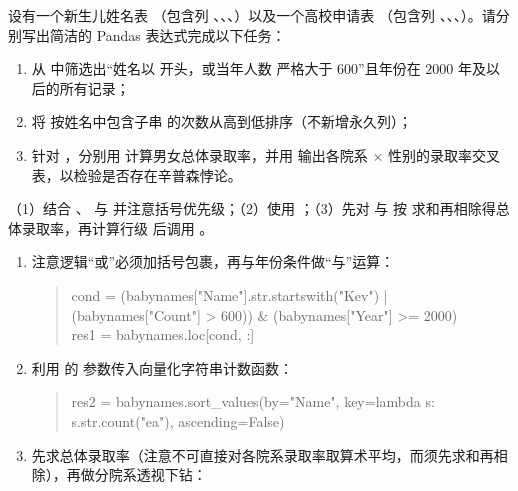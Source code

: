 \begin{exercise}[title={Pandas 综合查询与多维下钻编程},level=advanced,points=18,tags={Pandas,布尔索引,groupby,pivot\_table}]
设有一个新生儿姓名表 （包含列 、、、）以及一个高校申请表 （包含列 、、、）。请分别写出简洁的 Pandas 表达式完成以下任务：
\begin{enumerate}
  \item 从  中筛选出“姓名以  开头，或当年人数  严格大于 $600$”且年份在 $2000$ 年及以后的所有记录；
  \item 将  按姓名中包含子串  的次数从高到低排序（不新增永久列）；
  \item 针对 ，分别用  计算男女总体录取率，并用  输出各院系 $\times$ 性别的录取率交叉表，以检验是否存在辛普森悖论。
\end{enumerate}
\begin{answer}
（1）结合 、\lcinline{|} 与 \lcinline{\&} 并注意括号优先级；（2）使用 ；（3）先对  与  按  求和再相除得总体录取率，再计算行级  后调用 。
\end{answer}
\begin{solution}
\begin{enumerate}
  \item 注意逻辑“或”必须加括号包裹，再与年份条件做“与”运算：
  \begin{quote}\ttfamily\small
    cond = (babynames["Name"].str.startswith("Kev") | (babynames["Count"] > 600)) \& (babynames["Year"] >= 2000)\\
    res1 = babynames.loc[cond, :]
  \end{quote}
  \item 利用  的  参数传入向量化字符串计数函数：
  \begin{quote}\ttfamily\small
    res2 = babynames.sort\_values(by="Name", key=lambda s: s.str.count("ea"), ascending=False)
  \end{quote}
  \item 先求总体录取率（注意不可直接对各院系录取率取算术平均，而须先求和再相除），再做分院系透视下钻：

\end{enumerate}
\end{solution}
\end{exercise}
